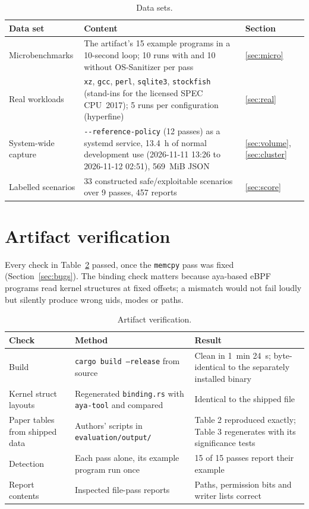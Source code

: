 \documentclass[11pt,a4paper]{article}
\newcommand{\pass}[1]{\texttt{#1}}
\begin{document}
\begin{table}[H]
\centering\small
\caption{Data sets.}
\label{tab:data}
\begin{tabularx}{\linewidth}{@{}l X l@{}}
\toprule
Data set & Content & Section \\
\midrule
Microbenchmarks & The artifact's 15 example programs in a 10-second loop; 10 runs with and 10 without OS-Sanitizer per pass & \ref{sec:micro} \\
Real workloads & \texttt{xz}, \texttt{gcc}, \texttt{perl}, \texttt{sqlite3}, \texttt{stockfish} (stand-ins for the licensed SPEC CPU~2017); 5 runs per configuration (hyperfine) & \ref{sec:real} \\
System-wide capture & \texttt{-{}-reference-policy} (12 passes) as a systemd service, 13.4~h of normal development use (2026-11-11 13:26 to 2026-11-12 02:51), 569~MiB JSON & \ref{sec:volume}, \ref{sec:cluster} \\
Labelled scenarios & 33 constructed safe/exploitable scenarios over 9 passes, 457 reports & \ref{sec:score} \\
\bottomrule
\end{tabularx}
\end{table}

\section{Artifact verification}
\label{sec:verify}

Every check in Table~\ref{tab:verify} passed, once the \pass{memcpy} pass was fixed
(Section~\ref{sec:bugs}). The binding check matters because aya-based eBPF programs read kernel
structures at fixed offsets; a mismatch would not fail loudly but silently produce wrong uids,
modes or paths.

\begin{table}[H]
\centering\small
\caption{Artifact verification.}
\label{tab:verify}
\begin{tabularx}{\linewidth}{@{}l X X@{}}
\toprule
Check & Method & Result \\
\midrule
Build & \texttt{cargo build --release} from source & Clean in 1~min 24~s; byte-identical to the separately installed binary \\
Kernel struct layouts & Regenerated \texttt{binding.rs} with \texttt{aya-tool} and compared & Identical to the shipped file \\
Paper tables from shipped data & Authors' scripts in \texttt{evaluation/output/} & Table 2 reproduced exactly; Table 3 regenerates with its significance tests \\
Detection & Each pass alone, its example program run once & 15 of 15 passes report their example \\
Report contents & Inspected file-pass reports & Paths, permission bits and writer lists correct \\
\bottomrule
\end{tabularx}
\end{table}
\end{document}
